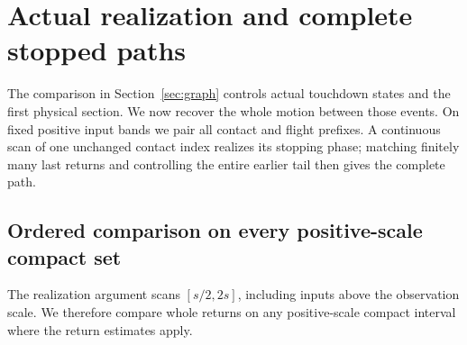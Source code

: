\section{Actual realization and complete stopped paths}
\label{sec:growth-realization}
\label{sec:physical-paths}

The comparison in Section~\ref{sec:graph} controls actual touchdown
states and the first physical section. We now recover the whole
motion between those events. On fixed positive input bands we pair
all contact and flight prefixes. A continuous scan of one unchanged
contact index realizes its stopping phase; matching finitely many
last returns and controlling the entire earlier tail then gives the
complete path.

\subsection{Ordered comparison on every positive-scale compact set}

The realization argument scans $[s/2,2s]$, including inputs above
the observation scale. We therefore compare whole returns on any
positive-scale compact interval where the return estimates apply.

